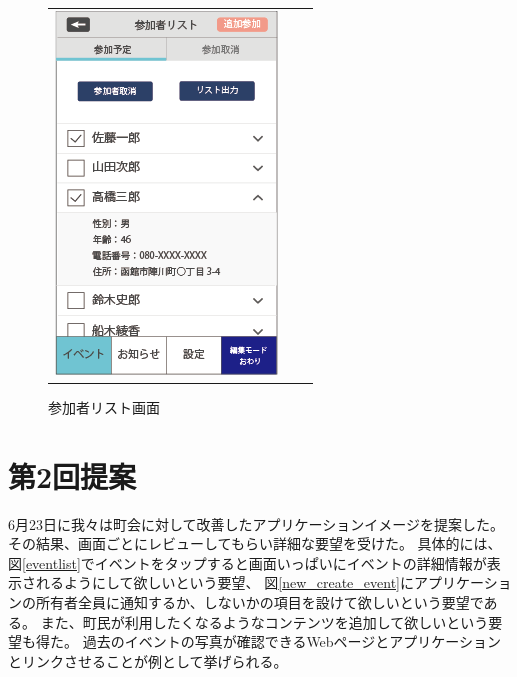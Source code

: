 \begin{figure}[h]
\begin{tabular}{ccc}
\begin{minipage}[t]{0.3\hsize}
      \end{minipage}
      \begin{minipage}[t]{0.3\hsize}
        \centering
        \includegraphics[keepaspectratio, scale=0.5]{process_figures/joinlist.png}
        \caption{参加者リスト画面}
        \label{joinedlist}
      \end{minipage}
    \end{tabular}
\end{figure}

\section{第2回提案}
6月23日に我々は町会に対して改善したアプリケーションイメージを提案した。
その結果、画面ごとにレビューしてもらい詳細な要望を受けた。
具体的には、図\ref{eventlist}でイベントをタップすると画面いっぱいにイベントの詳細情報が表示されるようにして欲しいという要望、
図\ref{new_create_event}にアプリケーションの所有者全員に通知するか、しないかの項目を設けて欲しいという要望である。
また、町民が利用したくなるようなコンテンツを追加して欲しいという要望も得た。
過去のイベントの写真が確認できるWebページとアプリケーションとリンクさせることが例として挙げられる。
